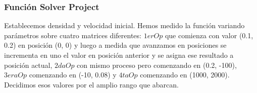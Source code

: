 \subsubsection{Función Solver Project}
Establecemos densidad y velocidad inicial. Hemos medido la función variando parámetros sobre cuatro matrices diferentes: $1erOp$ que comienza con valor (0.1, 0.2) en posición (0, 0) y luego a medida que avanzamos en posiciones se incrementa en uno el valor en posición anterior y se asigna ese resultado a posición actual, $2daOp$ con mismo proceso pero comenzando en (0.2, -100), $3eraOp$ comenzando en (-10, 0.08) y $4taOp$ comenzando en (1000, 2000). Decidimos esos valores por el amplio rango que abarcan.


